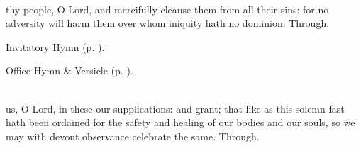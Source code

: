 \\

{} thy people, O Lord, and mercifully cleanse them from all their sins: for no adversity will harm them over whom iniquity hath no dominion. Through.



\mattins

\begin{rubric}
	Invitatory Hymn  (p. \pageref{SaturdayInvitatory}).
\end{rubric}


\begin{rubric}
	Office Hymn \& Versicle  (p. \pageref{SaturdayMattins}).
\end{rubric}

\\

{} us, O Lord, in these our supplications: and grant; that like as this solemn fast hath been ordained for the safety and healing of our bodies and our souls, so we may with devout observance celebrate the same. Through.


\clearpage
{}
\label{FirstLent}
\fancyhead[RE,LO]{}

\firstEvensong


\firstEvensongHymn\label{FirstLentEvensong}

